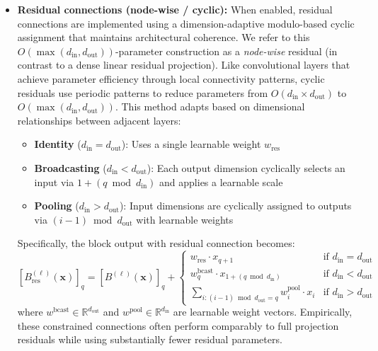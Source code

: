 \documentclass{article}
\theoremstyle{plain}
\theoremstyle{definition}
\theoremstyle{remark}
\begin{document}
\begin{itemize}
    \item \textbf{Residual connections (node-wise / cyclic):} When enabled, residual connections are implemented using a dimension-adaptive modulo-based cyclic assignment that maintains architectural coherence. We refer to this $O(\max(d_{\mathrm{in}}, d_{\mathrm{out}}))$-parameter construction as a \emph{node-wise} residual (in contrast to a dense linear residual projection). Like convolutional layers that achieve parameter efficiency through local connectivity patterns, cyclic residuals use periodic patterns to reduce parameters from $O(d_{\mathrm{in}} \times d_{\mathrm{out}})$ to $O(\max(d_{\mathrm{in}}, d_{\mathrm{out}}))$. This method adapts based on dimensional relationships between adjacent layers:
    \begin{itemize}
        \item \textbf{Identity} ($d_{\mathrm{in}} = d_{\mathrm{out}}$): Uses a single learnable weight $w_{\text{res}}$
        \item \textbf{Broadcasting} ($d_{\mathrm{in}} < d_{\mathrm{out}}$): Each output dimension cyclically selects an input via $1+(q \bmod d_{\mathrm{in}})$ and applies a learnable scale
        \item \textbf{Pooling} ($d_{\mathrm{in}} > d_{\mathrm{out}}$): Input dimensions are cyclically assigned to outputs via $(i-1) \bmod d_{\mathrm{out}}$ with learnable weights
    \end{itemize}
    Specifically, the block output with residual connection becomes:
    $$[B^{(\ell)}_{\text{res}}(\mathbf{x})]_q = [B^{(\ell)}(\mathbf{x})]_q + \begin{cases}
    w_{\text{res}} \cdot x_{q+1} & \text{if } d_{\mathrm{in}} = d_{\mathrm{out}}\\
    w_q^{\text{bcast}} \cdot x_{1+(q \bmod d_{\mathrm{in}})} & \text{if } d_{\mathrm{in}} < d_{\mathrm{out}}\\
    \sum_{i: (i-1) \bmod d_{\mathrm{out}} = q} w_i^{\text{pool}} \cdot x_i & \text{if } d_{\mathrm{in}} > d_{\mathrm{out}}
    \end{cases}$$
    where $w^{\text{bcast}} \in \mathbb{R}^{d_{\mathrm{out}}}$ and $w^{\text{pool}} \in \mathbb{R}^{d_{\mathrm{in}}}$ are learnable weight vectors. Empirically, these constrained connections often perform comparably to full projection residuals while using substantially fewer residual parameters.
    

\end{itemize}
\end{document}
